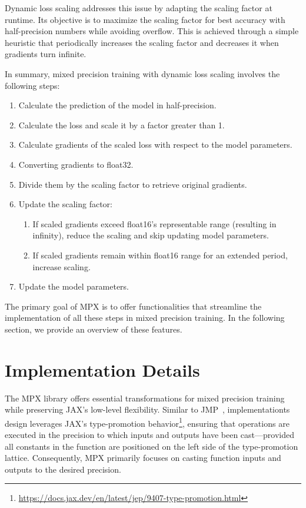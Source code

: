 \documentclass[10pt, a4paper, logo, onecolumn, internal, copyright]{dsme}
\newcommand{\mpx}{\textsc{MPX}}
\begin{document}
Dynamic loss scaling addresses this issue by adapting the scaling factor at runtime.
Its objective is to maximize the scaling factor for best accuracy with half-precision numbers while avoiding overflow. 
This is achieved through a simple heuristic that periodically increases the scaling factor and decreases it when gradients turn infinite.

In summary, mixed precision training with dynamic loss scaling involves the following steps:
\begin{enumerate}
    \item Calculate the prediction of the model in half-precision.
    \item Calculate the loss and scale it by a factor greater than 1.
    \item Calculate gradients of the scaled loss with respect to the model parameters.
    \item Converting gradients to float32.
    \item Divide them by the scaling factor to retrieve original gradients.
    \item Update the scaling factor:
    \begin{enumerate}[label=(\alph*)]
        \item If scaled gradients exceed float16's representable range (resulting in infinity), reduce the scaling and skip updating model parameters. 
        \item If scaled gradients remain within float16 range for an extended period, increase scaling.
    \end{enumerate}
    \item Update the model parameters.
\end{enumerate}

The primary goal of \mpx{} is to offer functionalities that streamline the implementation of all these steps in mixed precision training. 
In the following section, we provide an overview of these features.

\section{Implementation Details}

The \mpx{} library offers essential transformations for mixed precision training while preserving JAX's low-level flexibility. 
Similar to JMP~\cite{jmp}, implementationts design leverages JAX's type-promotion behavior\footnote{\url{https://docs.jax.dev/en/latest/jep/9407-type-promotion.html}}, ensuring that operations are executed in the precision to which inputs and outputs have been cast—provided all constants in the function are positioned on the left side of the type-promotion lattice. 
Consequently, \mpx{} primarily focuses on casting function inputs and outputs to the desired precision.
\end{document}
